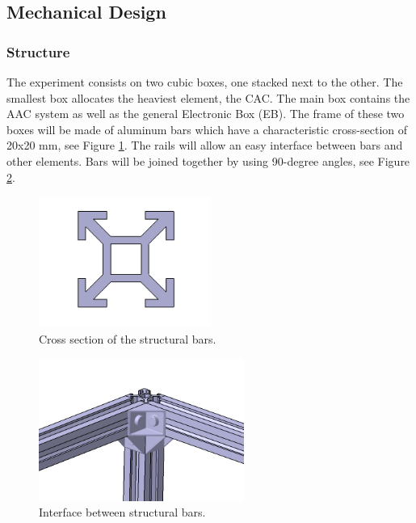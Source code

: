 \pagebreak
\subsection{Mechanical Design} \label{Mechanical_Design}


\subsubsection{Structure}

The experiment consists on two cubic boxes, one stacked next to the other. The smallest box allocates the heaviest element, the CAC. The main box contains the AAC system as well as the general Electronic Box (EB). The frame of these two boxes will be made of aluminum bars which have a characteristic cross-section of 20x20 mm, see Figure \ref{cross-section}. The rails will allow an easy interface between bars and other elements. Bars will be joined together by using 90-degree angles, see Figure \ref{3_bars_joined}.


\begin{figure}[!ht]
    \centering
    \includegraphics[width=0.5\textwidth]{4-experiment-design/img/1_cross_section.jpg}
    \caption{Cross section of the structural bars.}
    \label{cross-section}
\end{figure}


\begin{figure}[!ht]
    \centering
    \includegraphics[width=0.6\textwidth]{4-experiment-design/img/bars_joint.jpg}
    \caption{Interface between structural bars.}
    \label{3_bars_joined}
\end{figure}


